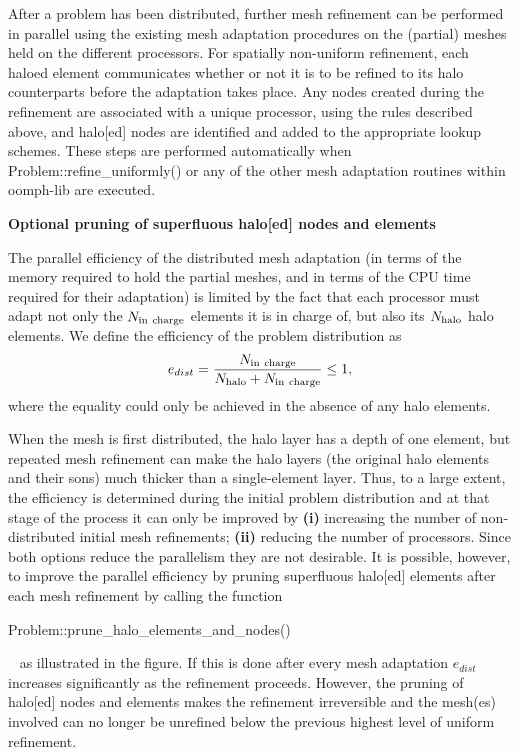 After a problem has been distributed, further mesh refinement can be performed in parallel using the existing mesh adaptation procedures on the (partial) meshes held on the different processors. For spatially non-\/uniform refinement, each haloed element communicates whether or not it is to be refined to its halo counterparts before the adaptation takes place. Any nodes created during the refinement are associated with a unique processor, using the rules described above, and halo\mbox{[}ed\mbox{]} nodes are identified and added to the appropriate lookup schemes. These steps are performed automatically when {\ttfamily Problem\+::refine\+\_\+uniformly()} or any of the other mesh adaptation routines within {\ttfamily oomph-\/lib} are executed.

{\bfseries  Optional pruning of superfluous halo\mbox{[}ed\mbox{]} nodes and elements }

The parallel efficiency of the distributed mesh adaptation (in terms of the memory required to hold the partial meshes, and in terms of the C\+PU time required for their adaptation) is limited by the fact that each processor must adapt not only the $N_{\rm in \ charge}$ elements it is in charge of, but also its $N_{\rm halo}$ halo elements. We define the efficiency of the problem distribution as \[ e_{dist} = \frac{N_{\rm in \ charge}}{N_{\rm halo} + N_{\rm in \ charge}} \le 1, \] where the equality could only be achieved in the absence of any halo elements.

When the mesh is first distributed, the halo layer has a depth of one element, but repeated mesh refinement can make the halo layers (the original halo elements and their sons) much thicker than a single-\/element layer. Thus, to a large extent, the efficiency is determined during the initial problem distribution and at that stage of the process it can only be improved by {\bfseries (i)} increasing the number of non-\/distributed initial mesh refinements; {\bfseries (ii)} reducing the number of processors. Since both options reduce the parallelism they are not desirable. It is possible, however, to improve the parallel efficiency by pruning superfluous halo\mbox{[}ed\mbox{]} elements after each mesh refinement by calling the function ~\newline
~\newline

\begin{DoxyCode}
Problem::prune\_halo\_elements\_and\_nodes()
\end{DoxyCode}
 ~\newline
as illustrated in the figure. If this is done after every mesh adaptation $ e_{dist}$ increases significantly as the refinement proceeds. However, the pruning of halo\mbox{[}ed\mbox{]} nodes and elements makes the refinement irreversible and the mesh(es) involved can no longer be unrefined below the previous highest level of uniform refinement.



